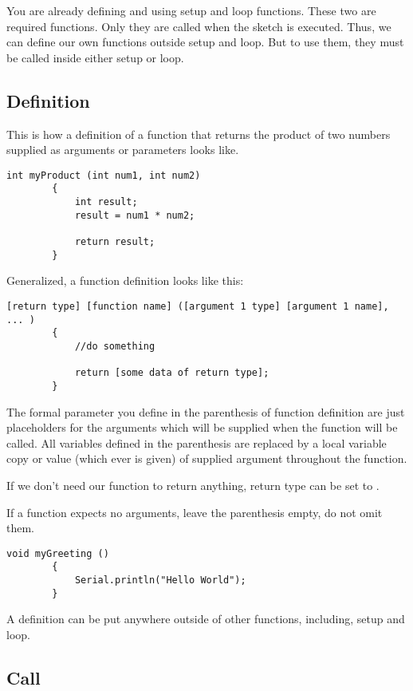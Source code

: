 \documentclass{article}
\begin{document}
	You are already defining and using setup and loop functions. These two are required functions. Only they are called when the sketch is executed. Thus, we can define our own functions outside setup and loop. But to use them, they must be called inside either setup or loop.

	\subsection{Definition}

		This is how a definition of a function that returns the product of two numbers supplied as arguments or parameters looks like.

		\begin{lstlisting}[gobble=8]
		int myProduct (int num1, int num2)
		{
			int result;
			result = num1 * num2;

			return result;
		}
		\end{lstlisting}

		Generalized, a function definition looks like this:

		\begin{lstlisting}[gobble=8]
		[return type] [function name] ([argument 1 type] [argument 1 name], ... )
		{
			//do something
			
			return [some data of return type];
		}
		\end{lstlisting}

		The formal parameter you define in the parenthesis of function definition are just placeholders for the arguments which will be supplied when the function will be called. All variables defined in the parenthesis are replaced by a local variable copy or value (which ever is given) of supplied argument throughout the function.

		If we don't need our function to return anything, return type can be set to .

		If a function expects no arguments, leave the parenthesis empty, do not omit them.
		
		\begin{lstlisting}[gobble=8]
		void myGreeting ()
		{
			Serial.println("Hello World");
		}
		\end{lstlisting}

		A definition can be put anywhere outside of other functions, including, setup and loop.

	\subsection{Call}
\end{document}
